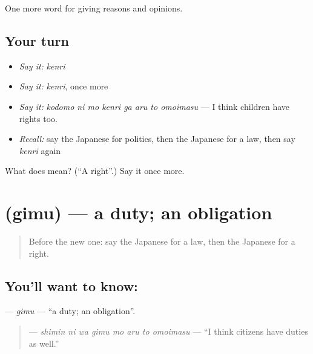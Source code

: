 \begin{grammarlens}[title={What you've built}]
One more word for giving reasons and opinions.
\end{grammarlens}

\subsection*{Your turn}
\begin{itemize}
\raggedright
  \item \emph{Say it:} \emph{kenri}
  \item \emph{Say it:} \emph{kenri}, once more
  \item \emph{Say it:} \emph{kodomo ni mo kenri ga aru to omoimasu} — I think children have rights too.
  \item \emph{Recall:} say the Japanese for politics, then the Japanese for a law, then say \emph{kenri} again
\end{itemize}

\begin{tcolorbox}[breakable,colback=teal!4,colframe=teal!35!black,title={Before you move on}]
What does  mean? (\textquotedblleft{}A right\textquotedblright{}.) Say it once more.
\end{tcolorbox}
\section[\texorpdfstring{\ja{ぎむ} (gimu)}{ぎむ (gimu)}]{ (gimu) — a duty; an obligation}

\label{lesson:JA-C332-gimu}



\begin{quote}
Before the new one: say the Japanese for a law, then the Japanese for a right.
\end{quote}

\subsection*{You'll want to know: }
\textbf{} — \emph{gimu} — \textquotedblleft{}a duty; an obligation\textquotedblright{}.

\begin{quote}
\textbf{   } — \emph{shimin ni wa gimu mo aru to omoimasu} — \textquotedblleft{}I think citizens have duties as well.\textquotedblright{}
\end{quote}

